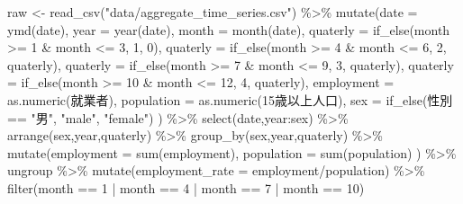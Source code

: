 \documentclass[
]{book}
\newenvironment{Shaded}{\begin{snugshade}}{\end{snugshade}}
\newcommand{\AttributeTok}[1]{\textcolor[rgb]{0.77,0.63,0.00}{#1}}
\newcommand{\DecValTok}[1]{\textcolor[rgb]{0.00,0.00,0.81}{#1}}
\newcommand{\FunctionTok}[1]{\textcolor[rgb]{0.00,0.00,0.00}{#1}}
\newcommand{\NormalTok}[1]{#1}
\newcommand{\OtherTok}[1]{\textcolor[rgb]{0.56,0.35,0.01}{#1}}
\newcommand{\SpecialCharTok}[1]{\textcolor[rgb]{0.00,0.00,0.00}{#1}}
\newcommand{\StringTok}[1]{\textcolor[rgb]{0.31,0.60,0.02}{#1}}
\begin{document}
\begin{Shaded}
\begin{Highlighting}[]
\NormalTok{raw }\OtherTok{\textless{}{-}} 
  \FunctionTok{read\_csv}\NormalTok{(}\StringTok{"data/aggregate\_time\_series.csv"}\NormalTok{) }\SpecialCharTok{\%\textgreater{}\%}
  \FunctionTok{mutate}\NormalTok{(}\AttributeTok{date =} \FunctionTok{ymd}\NormalTok{(date),}
         \AttributeTok{year =} \FunctionTok{year}\NormalTok{(date),}
         \AttributeTok{month =} \FunctionTok{month}\NormalTok{(date),}
         \AttributeTok{quaterly =} \FunctionTok{if\_else}\NormalTok{(month }\SpecialCharTok{\textgreater{}=} \DecValTok{1} \SpecialCharTok{\&}\NormalTok{ month }\SpecialCharTok{\textless{}=} \DecValTok{3}\NormalTok{, }\DecValTok{1}\NormalTok{, }\DecValTok{0}\NormalTok{),}
         \AttributeTok{quaterly =} \FunctionTok{if\_else}\NormalTok{(month }\SpecialCharTok{\textgreater{}=} \DecValTok{4} \SpecialCharTok{\&}\NormalTok{ month }\SpecialCharTok{\textless{}=} \DecValTok{6}\NormalTok{, }\DecValTok{2}\NormalTok{, quaterly),}
         \AttributeTok{quaterly =} \FunctionTok{if\_else}\NormalTok{(month }\SpecialCharTok{\textgreater{}=} \DecValTok{7} \SpecialCharTok{\&}\NormalTok{ month }\SpecialCharTok{\textless{}=} \DecValTok{9}\NormalTok{, }\DecValTok{3}\NormalTok{, quaterly),}
         \AttributeTok{quaterly =} \FunctionTok{if\_else}\NormalTok{(month }\SpecialCharTok{\textgreater{}=} \DecValTok{10} \SpecialCharTok{\&}\NormalTok{ month }\SpecialCharTok{\textless{}=} \DecValTok{12}\NormalTok{, }\DecValTok{4}\NormalTok{, quaterly),}
         \AttributeTok{employment =} \FunctionTok{as.numeric}\NormalTok{(就業者),}
         \AttributeTok{population =} \FunctionTok{as.numeric}\NormalTok{(}\StringTok{\textasciigrave{}}\AttributeTok{15歳以上人口}\StringTok{\textasciigrave{}}\NormalTok{),}
         \AttributeTok{sex =} \FunctionTok{if\_else}\NormalTok{(性別 }\SpecialCharTok{==} \StringTok{"男"}\NormalTok{, }\StringTok{"male"}\NormalTok{, }\StringTok{"female"}\NormalTok{)}
\NormalTok{         ) }\SpecialCharTok{\%\textgreater{}\%}
  \FunctionTok{select}\NormalTok{(date,year}\SpecialCharTok{:}\NormalTok{sex) }\SpecialCharTok{\%\textgreater{}\%}
  \FunctionTok{arrange}\NormalTok{(sex,year,quaterly) }\SpecialCharTok{\%\textgreater{}\%}
  \FunctionTok{group\_by}\NormalTok{(sex,year,quaterly) }\SpecialCharTok{\%\textgreater{}\%}
  \FunctionTok{mutate}\NormalTok{(}\AttributeTok{employment =} \FunctionTok{sum}\NormalTok{(employment),}
         \AttributeTok{population =} \FunctionTok{sum}\NormalTok{(population)}
\NormalTok{         ) }\SpecialCharTok{\%\textgreater{}\%}
\NormalTok{  ungroup }\SpecialCharTok{\%\textgreater{}\%}
  \FunctionTok{mutate}\NormalTok{(}\AttributeTok{employment\_rate =}\NormalTok{ employment}\SpecialCharTok{/}\NormalTok{population) }\SpecialCharTok{\%\textgreater{}\%}
  \FunctionTok{filter}\NormalTok{(month }\SpecialCharTok{==} \DecValTok{1} \SpecialCharTok{|} 
\NormalTok{           month }\SpecialCharTok{==} \DecValTok{4} \SpecialCharTok{|} 
\NormalTok{           month }\SpecialCharTok{==} \DecValTok{7} \SpecialCharTok{|} 
\NormalTok{           month }\SpecialCharTok{==} \DecValTok{10}\NormalTok{)}
\end{Highlighting}
\end{Shaded}
\end{document}
